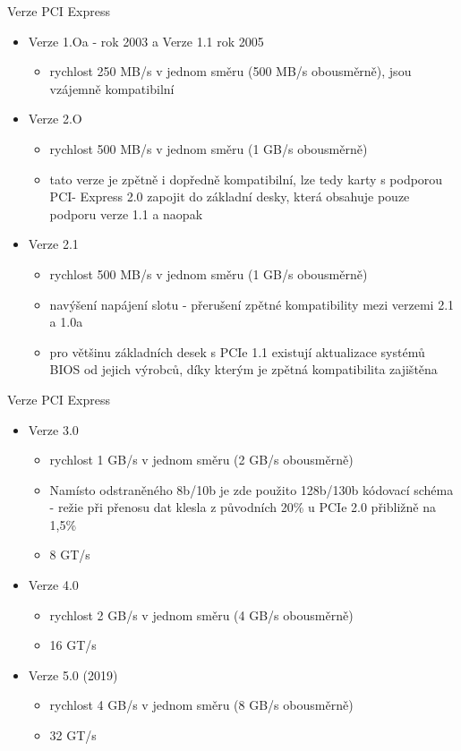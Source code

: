 \documentclass[aspectratio=43]{beamer}
\begin{document}
\begin{frame}{Verze PCI Express}
	\begin{itemize}
		\item Verze 1.Oa - rok 2003 a Verze 1.1 rok 2005
		      \begin{itemize}
		      	\item rychlost 250 MB/s v jednom směru (500 MB/s obousměrně), jsou vzájemně kompatibilní
		      \end{itemize}
		\item Verze 2.O
		      \begin{itemize}
		      	\item rychlost 500 MB/s v jednom směru (1 GB/s obousměrně)
		      	\item tato verze je zpětně i dopředně kompatibilní, lze tedy karty s podporou PCI- Express 2.0 zapojit do základní desky, která obsahuje pouze podporu verze 1.1 a naopak
		      \end{itemize}
		\item Verze 2.1
		      \begin{itemize}
		      	\item rychlost 500 MB/s v jednom směru (1 GB/s obousměrně)
		      	\item navýšení napájení slotu - přerušení zpětné kompatibility mezi verzemi 2.1 a 1.0a
		      	\item  pro většinu základních desek s PCIe 1.1 existují aktualizace systémů BIOS od jejich výrobců, díky kterým je zpětná kompatibilita zajištěna
		      \end{itemize}
	\end{itemize}
	
\end{frame}
\begin{frame}{Verze PCI Express}
	\begin{itemize}
		\item Verze 3.0
		      \begin{itemize}
		      	\item rychlost 1 GB/s v jednom směru (2 GB/s obousměrně)
		      	\item Namísto odstraněného 8b/10b je zde použito 128b/130b kódovací schéma - režie při přenosu dat klesla z původních 20\% u PCIe 2.0 přibližně na 1,5\%
		      	\item 8 GT/s
		      \end{itemize}
		\item Verze 4.0
		      \begin{itemize}
		      	\item rychlost 2 GB/s v jednom směru (4 GB/s obousměrně)
		      	\item 16 GT/s
		      \end{itemize}
		\item Verze 5.0 (2019)
		      \begin{itemize}
		      	\item rychlost 4 GB/s v jednom směru (8 GB/s obousměrně)
		      	\item 32 GT/s
		      \end{itemize}
	\end{itemize}
	
\end{frame}
\end{document}

